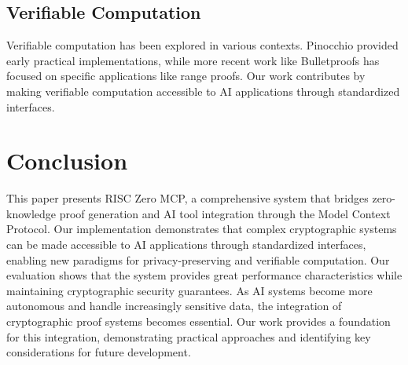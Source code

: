 \documentclass[11pt]{article}
\begin{document}
\subsection{Verifiable Computation}

Verifiable computation has been explored in various contexts. Pinocchio provided early practical implementations, while more recent work like Bulletproofs has focused on specific applications like range proofs. Our work contributes by making verifiable computation accessible to AI applications through standardized interfaces.


\section{Conclusion}
\label{sec:conclusion}

This paper presents RISC Zero MCP, a comprehensive system that bridges zero-knowledge proof generation and AI tool integration through the Model Context Protocol. Our implementation demonstrates that complex cryptographic systems can be made accessible to AI applications through standardized interfaces, enabling new paradigms for privacy-preserving and verifiable computation. Our evaluation shows that the system provides great performance characteristics while maintaining cryptographic security guarantees. As AI systems become more autonomous and handle increasingly sensitive data, the integration of cryptographic proof systems becomes essential. Our work provides a foundation for this integration, demonstrating practical approaches and identifying key considerations for future development.
\end{document}
